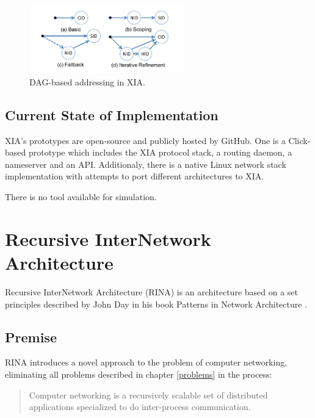                 \begin{figure}[H]
                    \begin{center}
                        \includegraphics[width=0.6\textwidth]{fig/archs_xia-dag.png}
                        \caption{DAG-based addressing in XIA.}
                        \label{fig:xia_dag}
                    \end{center}
                \end{figure}

        \subsection{Current State of Implementation}

            XIA's prototypes are open-source and publicly hosted by GitHub. One is a Click-based prototype which includes the XIA protocol stack, a routing daemon, a nameserver and an API. Additionaly, there is a native Linux network stack implementation with attempts to port different architectures to XIA.

            There is no tool available for simulation.

    \section{Recursive InterNetwork Architecture}\label{archs:rina}

        Recursive InterNetwork Architecture (RINA) is an architecture based on a set principles described by John Day in his book Patterns in Network Architecture \cite{Patterns}.

        \subsection{Premise}

            RINA introduces a novel approach to the problem of computer networking, eliminating all problems described in chapter \ref{problems} in the process:

            \begin{quotation}
                \centering
                Computer networking is a recursively scalable set of distributed applications specialized to do inter-process communication.
            \end{quotation}

